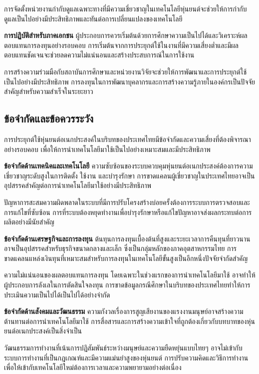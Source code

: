 \documentclass[a4paper]{article}
\begin{document}
การจัดตั้งหน่วยงานกำกับดูแลเฉพาะทางที่มีความเชี่ยวชาญในเทคโนโลยีหุ่นยนต์จะช่วยให้การกำกับดูแลเป็นไปอย่างมีประสิทธิภาพและทันต่อการเปลี่ยนแปลงของเทคโนโลยี

\textbf{การปฏิบัติสำหรับภาคเอกชน} ผู้ประกอบการควรเริ่มต้นด้วยการศึกษาความเป็นไปได้และวิเคราะห์ผลตอบแทนการลงทุนอย่างรอบคอบ การเริ่มต้นจากการประยุกต์ใช้ในงานที่มีความเสี่ยงต่ำและมีผลตอบแทนชัดเจนจะช่วยลดความไม่แน่นอนและสร้างประสบการณ์ในการใช้งาน

การสร้างความร่วมมือกับสถาบันการศึกษาและหน่วยงานวิจัยจะช่วยให้การพัฒนาและการประยุกต์ใช้เป็นไปอย่างมีประสิทธิภาพ การลงทุนในการพัฒนาบุคลากรและการสร้างความรู้ภายในองค์กรเป็นปัจจัยสำคัญสำหรับความสำเร็จในระยะยาว

\subsection{ข้อจำกัดและข้อควรระวัง}

การประยุกต์ใช้หุ่นยนต์อเนกประสงค์ในบริบทของประเทศไทยมีข้อจำกัดและความเสี่ยงที่ต้องพิจารณาอย่างรอบคอบ เพื่อให้การนำเทคโนโลยีมาใช้เป็นไปอย่างเหมาะสมและมีประสิทธิภาพ

\textbf{ข้อจำกัดด้านเทคนิคและเทคโนโลยี} ความซับซ้อนของระบบควบคุมหุ่นยนต์อเนกประสงค์ต้องการความเชี่ยวชาญระดับสูงในการติดตั้ง ใช้งาน และบำรุงรักษา \parencite{thuruthel2021survey} การขาดแคลนผู้เชี่ยวชาญในประเทศไทยอาจเป็นอุปสรรคสำคัญต่อการนำเทคโนโลยีมาใช้อย่างมีประสิทธิภาพ

ปัญหาการสะสมความผิดพลาดในระบบที่มีการปรับโครงสร้างบ่อยครั้งต้องการระบบการตรวจสอบและการแก้ไขที่ซับซ้อน การที่ระบบต้องหยุดทำงานเพื่อบำรุงรักษาหรือแก้ไขปัญหาอาจส่งผลกระทบต่อการผลิตอย่างมีนัยสำคัญ

\textbf{ข้อจำกัดด้านเศรษฐกิจและการลงทุน} ต้นทุนการลงทุนเบื้องต้นที่สูงและระยะเวลาการคืนทุนที่ยาวนานอาจเป็นอุปสรรคสำหรับธุรกิจขนาดกลางและเล็ก ซึ่งเป็นกลุ่มหลักของภาคอุตสาหกรรมไทย การขาดแคลนแหล่งเงินทุนที่เหมาะสมสำหรับการลงทุนในเทคโนโลยีขั้นสูงเป็นอีกหนึ่งปัจจัยจำกัดสำคัญ

ความไม่แน่นอนของผลตอบแทนการลงทุน โดยเฉพาะในช่วงแรกของการนำเทคโนโลยีมาใช้ อาจทำให้ผู้ประกอบการลังเลในการตัดสินใจลงทุน การขาดข้อมูลกรณีศึกษาในบริบทของประเทศไทยทำให้การประเมินความเป็นไปได้เป็นไปได้อย่างจำกัด

\textbf{ข้อจำกัดด้านสังคมและวัฒนธรรม} ความกังวลเรื่องการสูญเสียงานของแรงงานมนุษย์อาจสร้างความต้านทานต่อการนำเทคโนโลยีมาใช้ การสื่อสารและการสร้างความเข้าใจที่ถูกต้องเกี่ยวกับบทบาทของหุ่นยนต์อเนกประสงค์เป็นสิ่งจำเป็น

วัฒนธรรมการทำงานที่เน้นการปฏิสัมพันธ์ระหว่างมนุษย์และความยืดหยุ่นแบบไทยๆ อาจไม่เข้ากับระบบการทำงานที่เป็นกฎเกณฑ์และมีความแม่นยำสูงของหุ่นยนต์ การปรับความคิดและวิธีการทำงานเพื่อให้เข้ากับเทคโนโลยีใหม่ต้องการเวลาและความพยายามอย่างต่อเนื่อง
\end{document}
